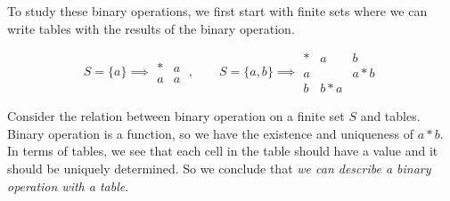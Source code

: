 \rmk To study these binary operations, we first start with finite sets where we can write tables with the results of the binary operation.

\[
    S = \{a\} \implies \begin{array}{c|c}
        * & a \\ \hline
        a & a
    \end{array}\;,
    \qquad
    S = \{a, b\} \implies
    \begin{array}{c|c|c}
        * & a     & b     \\ \hline
        a &       & a * b \\ \hline
        b & b * a &
    \end{array}
\]

Consider the relation between binary operation on a finite set \(S\) and tables. Binary operation is a function, so we have the existence and uniqueness of \(a * b\). In terms of tables, we see that each cell in the table should have a value and it should be uniquely determined. So we conclude that \textit{we can describe a binary operation with a table}.

\pagebreak

